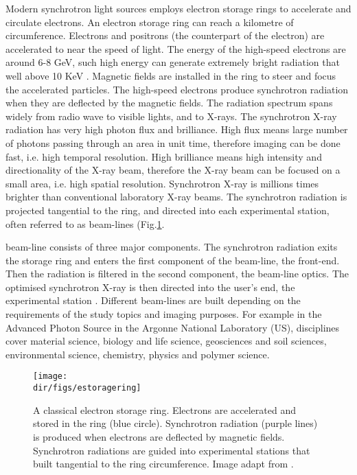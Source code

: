 Modern synchrotron light sources employs electron storage rings to accelerate and circulate electrons. An electron storage ring can reach a kilometre of circumference. Electrons and positrons (the counterpart of the electron) are accelerated to near the speed of light. The energy of the high-speed electrons are around 6-8 GeV, such high energy can generate extremely bright radiation that well above 10 KeV \citep{winicksynchrotron1987}. Magnetic fields are installed in the ring to steer and focus the accelerated particles. The high-speed electrons produce synchrotron radiation when they are deflected by the magnetic fields. The radiation spectrum spans widely from radio wave to visible lights, and to X-rays. The synchrotron X-ray radiation has very high photon flux and brilliance. High flux means large number of photons passing through an area in unit time, therefore imaging can be done fast, i.e. high temporal resolution. High brilliance means high intensity and directionality of the X-ray beam, therefore the X-ray beam can be focused on a small area, i.e. high spatial resolution\citep{wildenschild2013x}. Synchrotron X-ray is millions times brighter than conventional laboratory X-ray beams. The synchrotron radiation is projected tangential to the ring, and directed into each experimental station, often referred to as beam-lines (Fig.\ref{estoragering}.

beam-line consists of three major components. The synchrotron radiation exits the storage ring and enters the first component of the beam-line, the front-end. Then the radiation is filtered in the second component, the beam-line optics. The optimised synchrotron X-ray is then directed into the user's end, the experimental station \citep{wildenschild2013x}. Different beam-lines are built depending on the requirements of the study topics and imaging purposes. For example in the Advanced Photon Source in the Argonne National Laboratory (US), disciplines cover material science, biology and life science, geosciences and soil sciences, environmental science, chemistry, physics and polymer science.

\begin{figure}[htbp]
  \centering
  \texttt{[image: \\dir/figs/estoragering]}
  \caption{A classical electron storage ring. Electrons are accelerated and stored in the ring (blue circle). Synchrotron radiation (purple lines) is produced when electrons are deflected by magnetic fields. Synchrotron radiations are guided into experimental stations that built tangential to the ring circumference. Image adapt from \citet{winicksynchrotron1987}.}
  \label{estoragering}
\end{figure}

